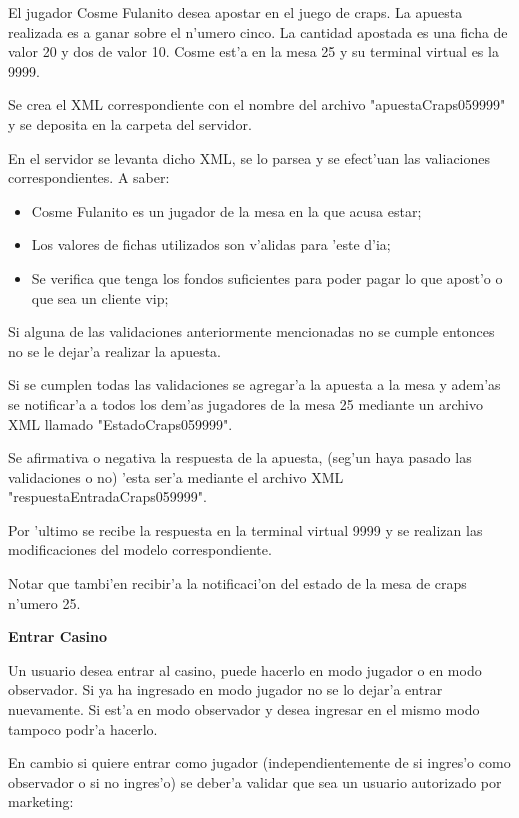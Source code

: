 El jugador Cosme Fulanito desea apostar en el juego de craps. La apuesta realizada es a ganar sobre el n'umero cinco. La cantidad apostada es una ficha de valor 20 y dos de valor 10. Cosme est'a en la mesa 25 y su terminal virtual es la 9999.

Se crea el XML correspondiente con el nombre del archivo "apuestaCraps059999" y se deposita en la carpeta del servidor.

En el servidor se levanta dicho XML, se lo parsea y se efect'uan las valiaciones correspondientes. A saber:

\begin{itemize}
 \item Cosme Fulanito es un jugador de la mesa en la que acusa estar;
 \item Los valores de fichas utilizados son v'alidas para 'este d'ia;
 \item Se verifica que tenga los fondos suficientes para poder pagar lo que apost'o o que sea un cliente vip;
\end{itemize}

Si alguna de las validaciones anteriormente mencionadas no se cumple entonces no se le dejar'a realizar la apuesta.

Si se cumplen todas las validaciones se agregar'a la apuesta a la mesa y adem'as se notificar'a a todos los dem'as jugadores de la mesa 25 mediante un archivo XML llamado "EstadoCraps059999".

Se afirmativa o negativa la respuesta de la apuesta, (seg'un haya pasado las validaciones o no) 'esta ser'a mediante el archivo XML "respuestaEntradaCraps059999".

Por 'ultimo se recibe la respuesta en la terminal virtual 9999 y se realizan las modificaciones del modelo correspondiente.

Notar que tambi'en recibir'a la notificaci'on del estado de la mesa de craps n'umero 25.


\clearpage

\textbf{Entrar Casino}

Un usuario desea entrar al casino, puede hacerlo en modo jugador o en modo observador.
Si ya ha ingresado en modo jugador no se lo dejar'a entrar nuevamente. Si est'a en modo observador y desea ingresar en el mismo modo tampoco podr'a hacerlo.

En cambio si quiere entrar como jugador (independientemente de si ingres'o como observador o si no ingres'o) se deber'a validar que sea un usuario autorizado por marketing:

